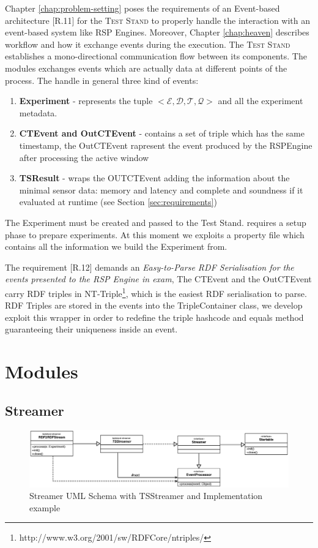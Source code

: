 Chapter \ref{chap:problem-setting} poses the requirements of an Event-based architecture [R.11] for the \textsc{Test Stand} to properly handle the interaction with an event-based system like RSP Engines. Moreover, Chapter \ref{chap:heaven} describes \name workflow and how it exchange events during the execution. The \textsc{Test Stand} establishes a mono-directional communication flow between its components. The modules exchanges events which are actually data at different points of the process.
The \name handle in general three kind of events:
\begin{enumerate}
\item \textbf{Experiment} - represents the tuple $<\mathcal{E}, \mathcal{D},\mathcal{T},\mathcal{Q}>$ and all the experiment metadata.
\item \textbf{CTEvent and OutCTEvent} - contains a set of triple which has the same timestamp, the OutCTEvent rapresent the event produced by the RSPEngine after processing the active window
\item \textbf{TSResult} - wraps the OUTCTEvent adding the information about the minimal sensor data: memory and latency and complete and soundness if it evaluated at runtime (see Section \ref{sec:requirements})
\end{enumerate}

The Experiment must be created and passed to the Test Stand. \name requires a setup phase to prepare experiments. At this moment we exploits a property file which contains all the information we build the Experiment from. 

The requirement [R.12] demands an \textit{Easy-to-Parse RDF Serialisation for the events presented to the RSP Engine in exam}, The CTEvent and the OutCTEvent carry RDF triples in NT-Triple\footnote{http://www.w3.org/2001/sw/RDFCore/ntriples/}, which is the easiest RDF serialisation to parse. RDF Triples are stored in the events into the TripleContainer class, we develop exploit this wrapper in order to redefine the triple hashcode and equals method guaranteeing their uniqueness inside an event.

\section{Modules}

\subsection{Streamer}	\label{sec:streamer-impl}
\begin{figure}[tbh]
  \centering
	\includegraphics[width=\linewidth]{images/uml_tstreamer}
	\caption{Streamer UML Schema with TSStreamer and Implementation example} 
  	\label{fig:tsstreamer}
\end{figure}

